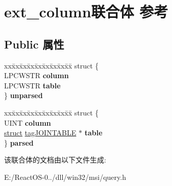 \hypertarget{unionext__column}{}\section{ext\+\_\+column联合体 参考}
\label{unionext__column}
\subsection*{Public 属性}
\begin{DoxyCompactItemize}
\item 
\mbox{\label{unionext__column_a335ab34a39ad875e1c850753b82396f4}} 
\begin{tabbing}
xx\=xx\=xx\=xx\=xx\=xx\=xx\=xx\=xx\=\kill
struct \{\\
\>LPCWSTR {\bfseries column}\\
\>LPCWSTR {\bfseries table}\\
\} {\bfseries unparsed}\\

\end{tabbing}\item 
\mbox{\label{unionext__column_acc38d08852f794e1c24b3b3a73d17d1b}} 
\begin{tabbing}
xx\=xx\=xx\=xx\=xx\=xx\=xx\=xx\=xx\=\kill
struct \{\\
\>UINT {\bfseries column}\\
\>\hyperlink{interfacestruct}{struct} \hyperlink{structtag_j_o_i_n_t_a_b_l_e}{tagJOINTABLE} $\ast$ {\bfseries table}\\
\} {\bfseries parsed}\\

\end{tabbing}\end{DoxyCompactItemize}


该联合体的文档由以下文件生成\+:\begin{DoxyCompactItemize}
\item 
E\+:/\+React\+O\+S-\/0../dll/win32/msi/query.\+h\end{DoxyCompactItemize}
